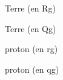 




\begin{enonce}
Terre (en Rg)
\end{enonce}





\begin{enonce}
Terre (en Qg)
\end{enonce}








\begin{enonce}
proton (en rg)
\end{enonce}





\begin{enonce}
proton (en qg)
\end{enonce}

